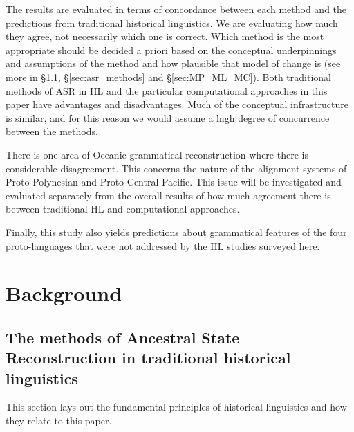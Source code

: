 \documentclass[12pt,letterpaper]{article}
\begin{document}
The results are evaluated in terms of concordance between each method and the predictions from traditional historical linguistics. We are evaluating how much they agree, not necessarily which one is correct. Which method is the most appropriate should be decided a priori based on the conceptual underpinnings and assumptions of the method and how plausible that model of change is (see more in §\ref{sec:ars:metod:hist}, §\ref{sec:asr_methods} and §\ref{sec:MP_ML_MC}). Both traditional methods of ASR in HL and the particular computational approaches in this paper have advantages and disadvantages. Much of the conceptual infrastructure is similar, and for this reason we would assume a high degree of concurrence between the methods. 

There is one area of Oceanic grammatical reconstruction where there is considerable disagreement. This concerns the nature of the alignment systems of Proto-Polynesian and Proto-Central Pacific. This issue will be investigated and evaluated separately from the overall results of how much agreement there is between traditional HL and computational approaches.

Finally, this study also yields predictions about grammatical features of the four proto-languages that were not addressed by the HL studies surveyed here.


\FloatBarrier
\section{Background}
\label{recon_grammar}

\subsection{The methods of Ancestral State Reconstruction in traditional historical linguistics}
\label{sec:ars:metod:hist}
This section lays out the fundamental principles of historical linguistics and how they relate to this paper.
\end{document}
